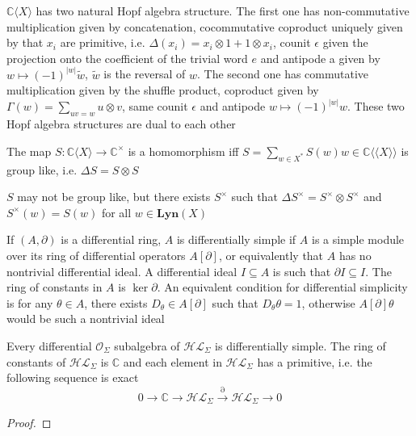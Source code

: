 \documentclass[main]{subfiles}
\begin{document}
$\mathbb C\langle X\rangle$ has two natural Hopf algebra structure. The first one has non-commutative multiplication given by concatenation, cocommutative coproduct uniquely given by that $x_i$ are primitive, i.e. $\Delta(x_i)=x_i\otimes1+1\otimes x_i$, counit $\epsilon$ given the projection onto the coefficient of the trivial word $e$ and antipode a given by $w\mapsto (-1)^{|w|}\tilde w$, $\tilde w$ is the reversal of $w$. The second one has commutative multiplication given by the shuffle product, coproduct given by $\displaystyle\Gamma(w)=\sum_{uv=w}u\otimes v$, same counit $\epsilon$ and antipode $w\mapsto(-1)^{|w|}w$. These two Hopf algebra structures are dual to each other

\begin{corollary}
The map $S:\mathbb C\langle X\rangle\to\mathbb C^\times$ is a homomorphism iff $S=\sum_{w\in X^*}S(w)w\in\mathbb C\langle\langle X\rangle\rangle$ is group like, i.e. $\Delta S=S\otimes S$
\end{corollary}

\begin{remark}
$S$ may not be group like, but there exists $S^\times$ such that $\Delta S^\times=S^\times\otimes S^\times$ and $S^\times(w)=S(w)$ for all $w\in\mathbf{Lyn}(X)$
\end{remark}

\begin{recall}
If $(A,\partial)$ is a differential ring, $A$ is differentially simple if $A$ is a simple module over its ring of differential operators $A[\partial]$, or equivalently that $A$ has no nontrivial differential ideal. A differential ideal $I\subseteq A$ is such that $\partial I\subseteq I$. The ring of constants in $A$ is $\ker\partial$. An equivalent condition for differential simplicity is for any $\theta\in A$, there exists $D_\theta\in A[\partial]$ such that $D_\theta\theta=1$, otherwise $A[\partial]\theta$ would be such a nontrivial ideal
\end{recall}

\begin{theorem}
Every differential $\mathcal O_\Sigma$ subalgebra of $\mathcal{HL}_\Sigma$ is differentially simple. The ring of constants of $\mathcal{HL}_\Sigma$ is $\mathbb C$ and each element in $\mathcal{HL}_\Sigma$ has a primitive, i.e. the following sequence is exact
\[0\to\mathbb C\to\mathcal{HL}_\Sigma\xrightarrow{\partial}\mathcal{HL}_\Sigma\to0\]
\end{theorem}

\begin{proof}

\end{proof}
\end{document}

